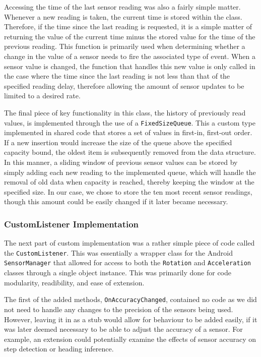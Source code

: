 \documentclass[main.tex]{subfiles}
\begin{document}
            Accessing the time of the last sensor reading was also a fairly simple matter. Whenever a new reading is taken, the current time
            is stored within the class. Therefore, if the time since the last reading is requested, it is a simple matter of returning the value of the current time minus the stored
            value for the time of the previous reading. This function is primarily used when determining whether a change in the value of a sensor needs to fire the associated type
            of event. When a sensor value is changed, the function that handles this new value is only called in the case where the time since the last reading is not less than that
            of the specified reading delay, therefore allowing the amount of sensor updates to be limited to a desired rate.
            
            The final piece of key functionality in this class, the history of previously read values, is implemented through the use of a \texttt{FixedSizeQueue}. This a custom
            type implemented in shared code that stores a set of values in first-in, first-out order. If a new insertion would increase the size of the queue above the specified
            capacity bound, the oldest item is subsequently removed from the data structure. In this manner, a sliding window of previous sensor values can be stored by simply
            adding each new reading to the implemented queue, which will handle the removal of old data when capacity is reached, thereby keeping the window at the specified size.
            In our case, we chose to store the ten most recent sensor readings, though this amount could be easily changed if it later became necessary.
        \subsubsection{CustomListener Implementation}
            The next part of custom implementation was a rather simple piece of code called the \texttt{CustomListener}. This was essentially a wrapper class for the 
            Android \texttt{SensorManager} that allowed for access to both the \texttt{Rotation} and \texttt{Acceleration} classes through a single object instance. This
            was primarily done for code modularity, readibility, and ease of extension.
            
            The first of the added methods, \texttt{OnAccuracyChanged}, contained no code as we did not need to handle any changes to the precision of the sensors being
            used. However, leaving it in as a stub would allow for behaviour to be added easily, if it was later deemed necessary to be able to adjust the accuracy of
            a sensor. For example, an extension could potentially examine the effects of sensor accuracy on step detection or heading inference.
            
\end{document}
